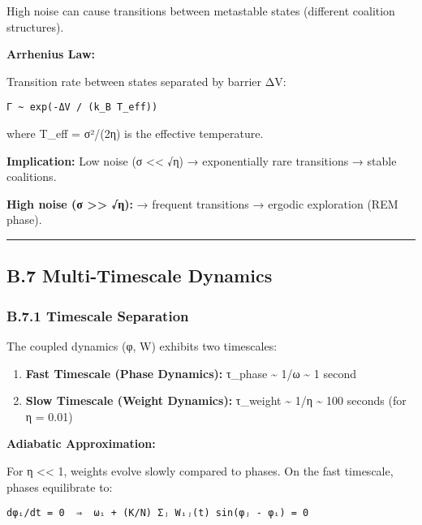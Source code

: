 \documentclass[
]{article}
\providecommand{\tightlist}{%
  \setlength{\itemsep}{0pt}\setlength{\parskip}{0pt}}
\begin{document}
High noise can cause transitions between metastable states (different
coalition structures).

\textbf{Arrhenius Law:}

Transition rate between states separated by barrier ΔV:

\begin{verbatim}
Γ ~ exp(-ΔV / (k_B T_eff))
\end{verbatim}

where T\_eff = σ²/(2η) is the effective temperature.

\textbf{Implication:} Low noise (σ \textless\textless{} √η) →
exponentially rare transitions → stable coalitions.

\textbf{High noise (σ \textgreater\textgreater{} √η):} → frequent
transitions → ergodic exploration (REM phase).

\begin{center}\rule{0.5\linewidth}{0.5pt}\end{center}

\subsection{B.7 Multi-Timescale
Dynamics}\label{b.7-multi-timescale-dynamics}

\subsubsection{B.7.1 Timescale
Separation}\label{b.7.1-timescale-separation}

The coupled dynamics (φ, W) exhibits two timescales:

\begin{enumerate}
\def\labelenumi{\arabic{enumi}.}
\tightlist
\item
  \textbf{Fast Timescale (Phase Dynamics):} τ\_phase \textasciitilde{}
  1/ω \textasciitilde{} 1 second
\item
  \textbf{Slow Timescale (Weight Dynamics):} τ\_weight \textasciitilde{}
  1/η \textasciitilde{} 100 seconds (for η = 0.01)
\end{enumerate}

\textbf{Adiabatic Approximation:}

For η \textless\textless{} 1, weights evolve slowly compared to phases.
On the fast timescale, phases equilibrate to:

\begin{verbatim}
dφᵢ/dt = 0  ⇒  ωᵢ + (K/N) Σⱼ Wᵢⱼ(t) sin(φⱼ - φᵢ) = 0
\end{verbatim}
\end{document}
